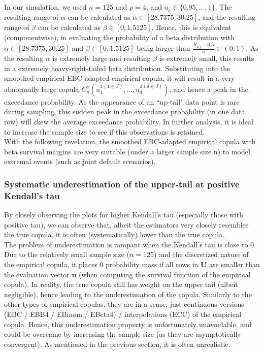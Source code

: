 \documentclass[12pt]{report}
\newcommand{\1}{\mathbf{1}}
\begin{document}
\begin{flushleft}
In our simulation, we used $n = 125$ and $\rho = 4$, and $u_{j} \in \{0.95, \dots, 1\}$. The resulting range of $\alpha$ can be calculated as $\alpha \in [28.7375, 30.25]$, and the resulting range of $\beta$ can be calculated as $\beta \in [0, 1.5125]$. Hence, this is equivalent (componentwise), in evaluating the probability of a beta distribution with $\alpha \in [28.7375, 30.25]$ and $\beta \in [0, 1.5125]$ being larger than $\frac{R_{i,j} - 0.5}{n} \in (0,1)$. As the resulting $\alpha$ is extremely large and resulting $\beta$ is extremely small, this results in a extremely heavy-right-tailed beta distribution. Substituting into the smoothed empirical EBC-adapted empirical copula, it will result in a very abnormally large copula $C^{v}_{n} \left( u_{1}^{\mathds{1}(1\in J)}, \dots, u_{d}^{\mathds{1}(d\in J)} \right)$, and hence a peak in the exceedance probability. As the appearance of an ``up-tail" data point is rare during sampling, this sudden peak in the exceedance probability (in one data row) will skew the average exceedance probability. In further analysis, it is ideal to increase the sample size to see if this observations is retained.\\
\vspace{0.5cm}
With the following revelation, the smoothed EBC-adapted empirical copula with beta survival margins are very suitable (under a larger sample size n) to model extremal events (such as joint default scenarios).

\subsubsection{Systematic underestimation of the upper-tail at positive Kendall's tau}
By closely observing the plots for higher Kendall's tau (especially those with positive tau), we can observe that, albeit the estimators very closely resembles the true copula, it is often (systematically) lower than the true copula.\\
\vspace{0.5cm}
The problem of underestimation is rampant when the Kendall's tau is close to 0. Due to the relatively small sample size ($n = 125$) and the discretized nature of the empirical copula, it places 0 probability mass if all rows in $\boldsymbol{U}$ are smaller than the evaluation vector $\boldsymbol{u}$ (when computing the survival function of the empirical copula). In reality, the true copula still has weight on the upper tail (albeit negligible), hence leading to the underestimation of the copula. Similarly to the other types of empirical copulas, they are in a sense, just continuous versions (EBC / EBB4 / EBinom / EBeta4) / interpolations (ECC) of the empirical copula. Hence, this underestimation property is unfortunately unavoidable, and could be overcame by increasing the sample size (as they are asymptotically convergent). As mentioned in the previous section, it is often unrealistic. 


\end{flushleft}
\end{document}
